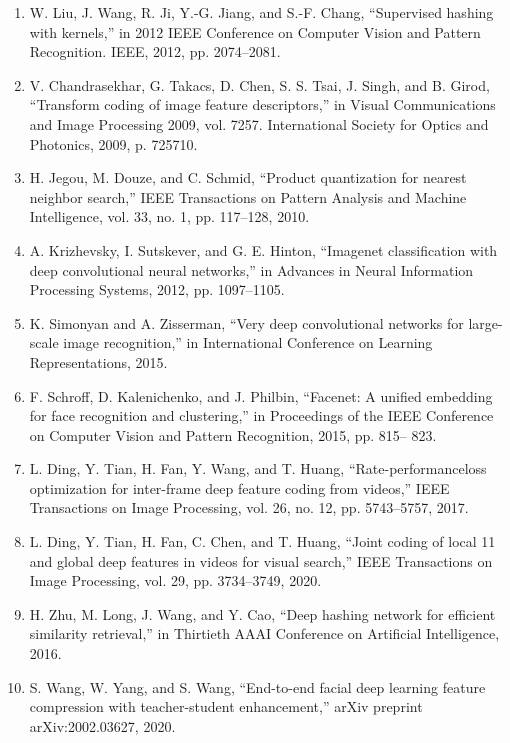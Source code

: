 \documentclass{article}
\begin{document}
\begin{enumerate}
	\item W. Liu, J. Wang, R. Ji, Y.-G. Jiang, and S.-F. Chang, “Supervised
	hashing with kernels,” in 2012 IEEE Conference on Computer Vision
	and Pattern Recognition. IEEE, 2012, pp. 2074–2081.

	\item V. Chandrasekhar, G. Takacs, D. Chen, S. S. Tsai, J. Singh, and
	B. Girod, “Transform coding of image feature descriptors,” in Visual
	Communications and Image Processing 2009, vol. 7257. International
	Society for Optics and Photonics, 2009, p. 725710.

	\item H. Jegou, M. Douze, and C. Schmid, “Product quantization for nearest
	neighbor search,” IEEE Transactions on Pattern Analysis and Machine
	Intelligence, vol. 33, no. 1, pp. 117–128, 2010.

	\item A. Krizhevsky, I. Sutskever, and G. E. Hinton, “Imagenet classification
	with deep convolutional neural networks,” in Advances in Neural Information Processing Systems, 2012, pp. 1097–1105.

	\item K. Simonyan and A. Zisserman, “Very deep convolutional networks for
	large-scale image recognition,” in International Conference on Learning
	Representations, 2015.

	\item F. Schroff, D. Kalenichenko, and J. Philbin, “Facenet: A unified embedding for face recognition and clustering,” in Proceedings of the IEEE
	Conference on Computer Vision and Pattern Recognition, 2015, pp. 815–
	823.

	\item L. Ding, Y. Tian, H. Fan, Y. Wang, and T. Huang, “Rate-performanceloss optimization for inter-frame deep feature coding from videos,” IEEE
	Transactions on Image Processing, vol. 26, no. 12, pp. 5743–5757, 2017.

	\item L. Ding, Y. Tian, H. Fan, C. Chen, and T. Huang, “Joint coding of local
	11
	and global deep features in videos for visual search,” IEEE Transactions
	on Image Processing, vol. 29, pp. 3734–3749, 2020.

	\item H. Zhu, M. Long, J. Wang, and Y. Cao, “Deep hashing network for
	efficient similarity retrieval,” in Thirtieth AAAI Conference on Artificial
	Intelligence, 2016.

	\item S. Wang, W. Yang, and S. Wang, “End-to-end facial deep learning
	feature compression with teacher-student enhancement,” arXiv preprint
	arXiv:2002.03627, 2020.


\end{enumerate}
\end{document}
